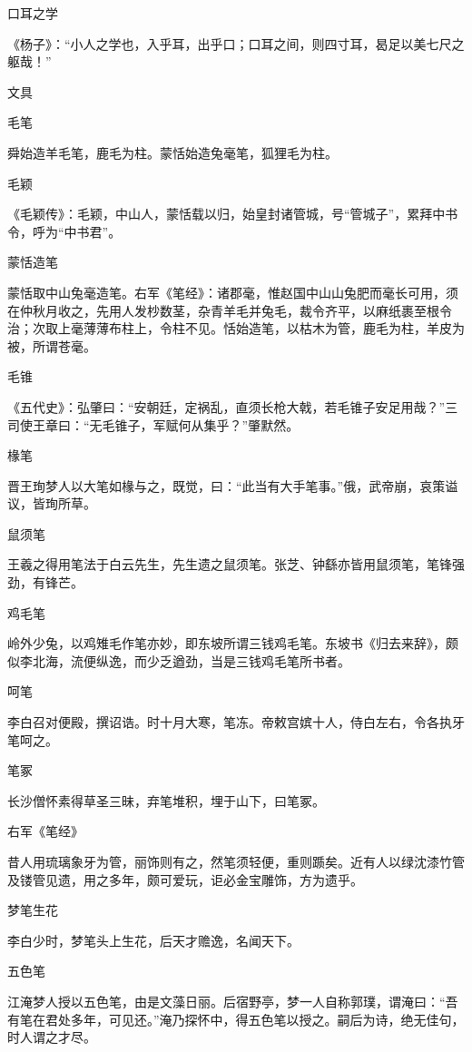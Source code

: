 \documentclass[a4paper,12pt,UTF8,twoside]{ctexbook}
\begin{document}
    口耳之学
    
    《杨子》：“小人之学也，入乎耳，出乎口；口耳之间，则四寸耳，曷足以美七尺之躯哉！”
    
    文具
    
    毛笔
    
    舜始造羊毛笔，鹿毛为柱。蒙恬始造兔毫笔，狐狸毛为柱。
    
    毛颖
    
    《毛颖传》：毛颖，中山人，蒙恬载以归，始皇封诸管城，号“管城子”，累拜中书令，呼为“中书君”。
    
    蒙恬造笔
    
    蒙恬取中山兔毫造笔。右军《笔经》：诸郡毫，惟赵国中山山兔肥而毫长可用，须在仲秋月收之，先用人发杪数茎，杂青羊毛并兔毛，裁令齐平，以麻纸裹至根令治；次取上毫薄薄布柱上，令柱不见。恬始造笔，以枯木为管，鹿毛为柱，羊皮为被，所谓苍毫。
    
    毛锥
    
    《五代史》：弘肇曰：“安朝廷，定祸乱，直须长枪大戟，若毛锥子安足用哉？”三司使王章曰：“无毛锥子，军赋何从集乎？”肇默然。
    
    椽笔
    
    晋王珣梦人以大笔如椽与之，既觉，曰：“此当有大手笔事。”俄，武帝崩，哀策谥议，皆珣所草。
    
    鼠须笔
    
    王羲之得用笔法于白云先生，先生遗之鼠须笔。张芝、钟繇亦皆用鼠须笔，笔锋强劲，有锋芒。
    
    鸡毛笔
    
    岭外少兔，以鸡雉毛作笔亦妙，即东坡所谓三钱鸡毛笔。东坡书《归去来辞》，颇似李北海，流便纵逸，而少乏遒劲，当是三钱鸡毛笔所书者。
    
    呵笔
    
    李白召对便殿，撰诏诰。时十月大寒，笔冻。帝敕宫嫔十人，侍白左右，令各执牙笔呵之。
    
    笔冢
    
    长沙僧怀素得草圣三昧，弃笔堆积，埋于山下，曰笔冢。
    
    右军《笔经》
    
    昔人用琉璃象牙为管，丽饰则有之，然笔须轻便，重则踬矣。近有人以绿沈漆竹管及镂管见遗，用之多年，颇可爱玩，讵必金宝雕饰，方为遗乎。
    
    梦笔生花
    
    李白少时，梦笔头上生花，后天才赡逸，名闻天下。
    
    五色笔
    
    江淹梦人授以五色笔，由是文藻日丽。后宿野亭，梦一人自称郭璞，谓淹曰：“吾有笔在君处多年，可见还。”淹乃探怀中，得五色笔以授之。嗣后为诗，绝无佳句，时人谓之才尽。
    
\end{document}
